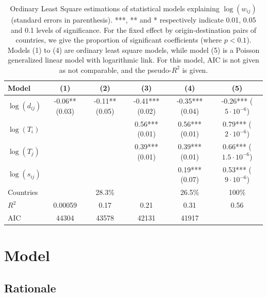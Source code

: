 \documentclass[11pt]{article}
\begin{document}
\begin{table}[h]
\caption{Ordinary Least Square estimations of statistical models explaining $\log(w_{ij})$ (standard errors in parenthesis). ***, ** and * respectively indicate 0.01, 0.05 and 0.1 levels of significance. For the fixed effect by origin-destination pairs of countries, we give the proportion of significant coefficients (where $p<0.1$). Models (1) to (4) are ordinary least square models, while model (5) is a Poisson generalized linear model with logarithmic link. For this model, AIC is not given as not comparable, and the pseudo-$R^2$ is given.\label{tab:reg}}
\medskip
\begin{tabular}{|l|c|c|c|c|c|}
\hline
Model  & (1) & (2) & (3) & (4) & (5) \\ 
\hline
$\log(d_{ij})$ &      -0.06** (0.03) &   -0.11** (0.05)  & -0.41*** (0.02)  & -0.35*** (0.04)  &  -0.26*** ($5\cdot 10^{-6}$) \\
$\log(T_i)$ &   &   & 0.56*** (0.01) &  0.56*** (0.01) & 0.79*** ($2\cdot 10^{-6}$) \\
$\log(T_j)$ &     &   & 0.39*** (0.01) &  0.39*** (0.01) & 0.66***  ($1.5\cdot 10^{-6}$) \\
$\log(s_{ij})$ &     &   &  &  0.19*** (0.07) & 0.53*** ($9\cdot 10^{-6}$)  \\
Countries &    &  28.3\% &   &  26.5\% & 100\% \\
\hline
$R^2$ &       0.00059   &  0.17 & 0.21 &  0.31  &  0.56 \\
AIC &        44304   &  43578  &  42131  & 41917 &   \\
\hline
\end{tabular}
\end{table}



\section{Model}

\subsection{Rationale}
\end{document}
